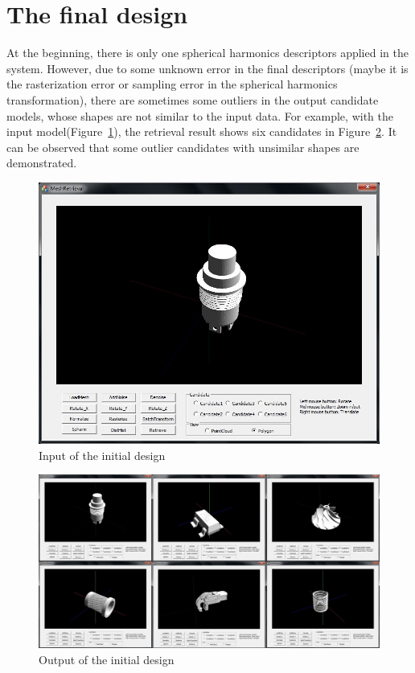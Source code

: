 \section{The final design} \label{sec:thefinaldesign}

At the beginning, there is only one spherical harmonics descriptors applied in the system. However, due to some unknown error in the final descriptors (maybe it is the rasterization error or sampling error in the spherical harmonics transformation), there are sometimes some outliers in the output candidate models, whose shapes are not similar to the input data. For example, with the input model(Figure~\ref{input_initialdesign}), the retrieval result shows six candidates in Figure~\ref{output_initialdesign}. It can be observed that some outlier candidates with unsimilar shapes are demonstrated. 


\begin{figure}[h]
\centering
\includegraphics[width=0.7\linewidth]{input_initialdesign}
\caption{Input of the initial design} \label{input_initialdesign}
\end{figure}

\begin{figure}[h]
\centering
\includegraphics[width=0.7\linewidth]{output_initialdesign}
\caption{Output of the initial design} \label{output_initialdesign}
\end{figure}


